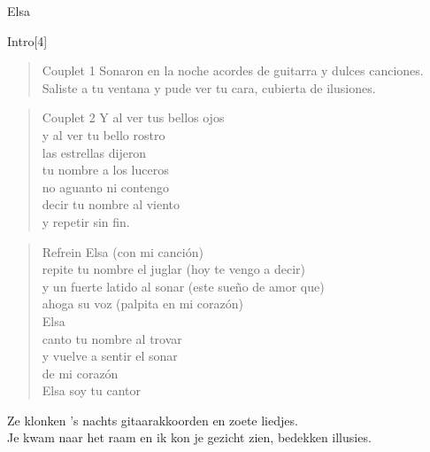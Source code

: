 \begin{song}[tango]{Elsa}
\begin{instrumental}{Intro}[4]
 \measure{}  \measure{}
 \measure{}  \measure{}
 \measure{}  \measure{}
 \measure{} 
\end{instrumental}

\begin{verse}{Couplet 1}
Sonaron en la noche 
acordes de guitarra 
y dulces canciones.\\
Saliste a tu ventana 
y pude ver tu cara, 
cubierta de ilusiones.
\end{verse}

\begin{verse}{Couplet 2}
Y al ver tus bellos ojos\\
y al ver tu bello rostro\\
las estrellas dijeron \\
tu nombre a los luceros\\
no aguanto ni contengo\\
decir tu nombre al viento\\
y repetir sin fin.
\end{verse}


\begin{verse}{Refrein}
Elsa   (con mi canción)\\
repite tu nombre el juglar  (hoy te vengo a decir)\\
y un fuerte latido al sonar  (este sueño de amor que)\\
ahoga su voz   (palpita en mi corazón)\\
  
Elsa\\
canto tu nombre al trovar\\
y vuelve a sentir el sonar\\
de mi corazón\\

Elsa soy tu cantor
\end{verse}

\clearpage
\begin{translation}
Ze klonken 's nachts gitaarakkoorden en zoete liedjes.\\
Je kwam naar het raam en ik kon je gezicht zien, bedekken illusies.\vspace{\wlskip}


\end{translation}
\end{song}
